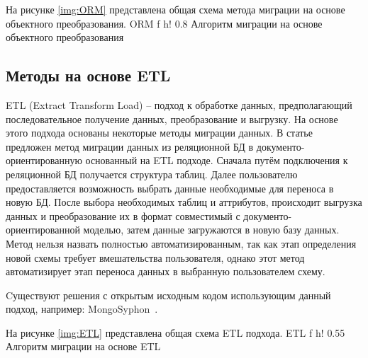 На рисунке \ref{img:ORM} представлена общая схема метода миграции на основе объектного преобразования.
    {ORM} %
    {f} %
    {h!} %
    {0.8\textwidth} %
{Алгоритм миграции на основе объектного преобразования} %

\clearpage

\subsection{Методы на основе ETL}
ETL (Extract Transform Load) -- подход к обработке данных, предполагающий последовательное получение данных, преобразование и выгрузку.
На основе этого подхода основаны некоторые методы миграции данных.
В статье~\cite{etl} предложен метод миграции данных из реляционной БД в документо-ориентированную основанный на ETL подходе.
Сначала путём подключения к реляционной БД получается структура таблиц.
Далее пользователю предоставляется возможность выбрать данные необходимые для переноса в новую БД.
После выбора необходимых таблиц и аттрибутов, происходит выгрузка данных и преобразование их в формат совместимый с документо-ориентированной моделью, затем данные загружаются в новую базу данных. 
Метод нельзя назвать полностью автоматизированным, так как этап определения новой схемы требует вмешательства пользователя, однако этот метод автоматизирует этап переноса данных в выбранную пользователем схему.

Cуществуют решения с открытым исходным кодом использующим данный подход, например: MongoSyphon~\cite{mongosyphon}.

На рисунке \ref{img:ETL} представлена общая схема ETL подхода.
    {ETL} %
    {f} %
    {h!} %
    {0.55\textwidth} %
    {Алгоритм миграции на основе ETL} %

\clearpage


